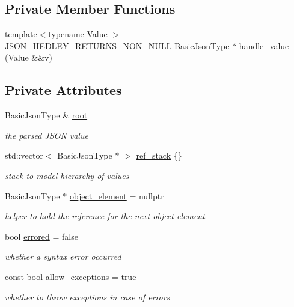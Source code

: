 \subsection*{Private Member Functions}
\begin{DoxyCompactItemize}
\item 
{\footnotesize template$<$typename Value $>$ }\\\mbox{\hyperlink{json_8hpp_a5f2aaec3b681d0a72f7d6e90b70cdcd1}{J\+S\+O\+N\+\_\+\+H\+E\+D\+L\+E\+Y\+\_\+\+R\+E\+T\+U\+R\+N\+S\+\_\+\+N\+O\+N\+\_\+\+N\+U\+LL}} Basic\+Json\+Type $\ast$ \mbox{\hyperlink{classnlohmann_1_1detail_1_1json__sax__dom__parser_aa1a5e21be350727cf61a101aa5c6796e}{handle\+\_\+value}} (Value \&\&v)
\end{DoxyCompactItemize}
\subsection*{Private Attributes}
\begin{DoxyCompactItemize}
\item 
Basic\+Json\+Type \& \mbox{\hyperlink{classnlohmann_1_1detail_1_1json__sax__dom__parser_aef0477277389e399d7128898841b71c0}{root}}
\begin{DoxyCompactList}\small\item\em the parsed J\+S\+ON value \end{DoxyCompactList}\item 
std\+::vector$<$ Basic\+Json\+Type $\ast$ $>$ \mbox{\hyperlink{classnlohmann_1_1detail_1_1json__sax__dom__parser_aa7526e7ae7be7f63803a23fd8cf36e5d}{ref\+\_\+stack}} \{\}
\begin{DoxyCompactList}\small\item\em stack to model hierarchy of values \end{DoxyCompactList}\item 
Basic\+Json\+Type $\ast$ \mbox{\hyperlink{classnlohmann_1_1detail_1_1json__sax__dom__parser_a9c03c76d3a8e89c8928097ba0b92c2db}{object\+\_\+element}} = nullptr
\begin{DoxyCompactList}\small\item\em helper to hold the reference for the next object element \end{DoxyCompactList}\item 
bool \mbox{\hyperlink{classnlohmann_1_1detail_1_1json__sax__dom__parser_a31ccb472ed855e2f2370fd091d91aad7}{errored}} = false
\begin{DoxyCompactList}\small\item\em whether a syntax error occurred \end{DoxyCompactList}\item 
const bool \mbox{\hyperlink{classnlohmann_1_1detail_1_1json__sax__dom__parser_ad0953e8d888339421d909d9016bc6e2c}{allow\+\_\+exceptions}} = true
\begin{DoxyCompactList}\small\item\em whether to throw exceptions in case of errors \end{DoxyCompactList}\end{DoxyCompactItemize}


